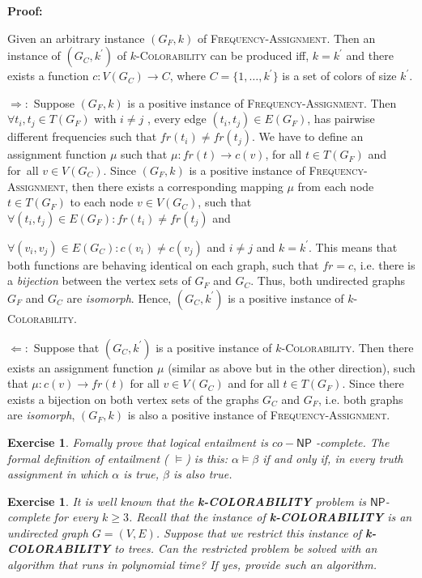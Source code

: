 \documentclass[11pt]{article}
\newtheorem{exercise}[theorem]{Exercise}
\begin{document}
\textbf{Proof:}

Given an arbitrary instance $(G_{F},k)$ of \textsc{Frequency-Assignment}.
Then an instance of $(G_{C},k^{\prime })$ of $k$\textsc{-Colorability} can
be produced iff, $k=k^{\prime }$ and there exists a function $%
c:V(G_{C})\rightarrow C$, where $C=\{1,\ldots ,k^{\prime }\}$ is a set of
colors of size $k^{\prime }$.

$\Rightarrow :$ Suppose $(G_{F},k)$ is a positive instance of \textsc{%
Frequency-Assignment}. Then $\forall t_{i},t_{j}\in T(G_{F})$ with $i\neq j$%
, every edge $(t_{i},t_{j})\in E(G_{F})$, has pairwise different frequencies
such that $fr(t_{i})\neq fr(t_{j})$. We have to define an assignment
function $\mu $ such that $\mu :fr(t)\rightarrow c(v)$, for all $t\in
T(G_{F})$ and for\ all $v\in V(G_{C})$. Since $(G_{F},k)$ is a positive
instance of \textsc{Frequency-Assignment}, then there exists a corresponding
mapping $\mu $ from each node $t\in T(G_{F})$ to each node $v\in V(G_{C})$,
such that $\forall (t_{i},t_{j})\in E(G_{F}):fr(t_{i})\neq fr(t_{j})$ and

$\forall (v_{i},v_{j})\in E(G_{C}):c(v_{i})\neq c(v_{j})$ and $i\neq j$ and $%
k=k^{\prime }$. This means that both functions are behaving identical on
each graph, such that $fr=c$, i.e. there is a \textit{bijection} between the
vertex sets of $G_{F}$ and $G_{C}$. Thus, both undirected graphs $G_{F}$ and 
$G_{C}$ are \textit{isomorph}. Hence, $(G_{C},k^{\prime })$ is a positive
instance of $k$\textsc{-Colorability}$.$

$\Leftarrow :$ Suppose that $(G_{C},k^{\prime })$ is a positive instance of $%
k$\textsc{-Colorability}. Then there exists an assignment function $\mu $
(similar as above but in the other direction), such that $\mu
:c(v)\rightarrow fr(t)$ for all $v\in V(G_{C})$ and for all $t\in T(G_{F})$.
Since there exists a bijection on both vertex sets of the graphs $G_{C}$ and 
$G_{F}$, i.e. both graphs are \textit{isomorph}, $(G_{F},k)$ is also a
positive instance of \textsc{Frequency-Assignment}.

\bigskip

\begin{exercise}
\label{ex:CO-NP} Fomally prove that logical entailment is $co-\mathsf{NP}$%
-complete. The formal definition of entailment ( $\models $) is this: $%
\alpha \models \beta $ if and only if, in every truth assignment in which $%
\alpha $ is true, $\beta $ is also true.
\end{exercise}

\begin{exercise}
\label{ex:Colors} It is well known that the \textbf{k-COLORABILITY} problem
is $\mathsf{NP}$-complete for every $k\geq 3$. Recall that the instance of 
\textbf{k-COLORABILITY} is an undirected graph $G=(V,E)$. Suppose that we
restrict this instance of \textbf{k-COLORABILITY} to trees. Can the
restricted problem be solved with an algorithm that runs in polynomial time?
If yes, provide such an algorithm.
\end{exercise}
\end{document}

